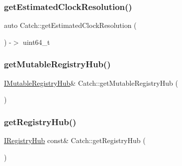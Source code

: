 \mbox{\label{namespace_catch_ac8e1ed37624bd0d97b2c0d4ec099d31f}} 
\subsubsection{\texorpdfstring{getEstimatedClockResolution()}{getEstimatedClockResolution()}}
{\footnotesize\ttfamily auto Catch\+::get\+Estimated\+Clock\+Resolution (\begin{DoxyParamCaption}{ }\end{DoxyParamCaption}) -\/$>$  uint64\+\_\+t}

\mbox{\label{namespace_catch_ac9ddcc6d66079add9cb2a3140b8ae51e}} 
\subsubsection{\texorpdfstring{getMutableRegistryHub()}{getMutableRegistryHub()}}
{\footnotesize\ttfamily \mbox{\hyperlink{struct_catch_1_1_i_mutable_registry_hub}{I\+Mutable\+Registry\+Hub}}\& Catch\+::get\+Mutable\+Registry\+Hub (\begin{DoxyParamCaption}{ }\end{DoxyParamCaption})}

\mbox{\label{namespace_catch_a6332c92ab0c3952586b22cb96fdb8d44}} 
\subsubsection{\texorpdfstring{getRegistryHub()}{getRegistryHub()}}
{\footnotesize\ttfamily \mbox{\hyperlink{struct_catch_1_1_i_registry_hub}{I\+Registry\+Hub}} const\& Catch\+::get\+Registry\+Hub (\begin{DoxyParamCaption}{ }\end{DoxyParamCaption})}

\mbox{\label{namespace_catch_aff60c1de6ac6cea30175d70e33d83c8e}} 
